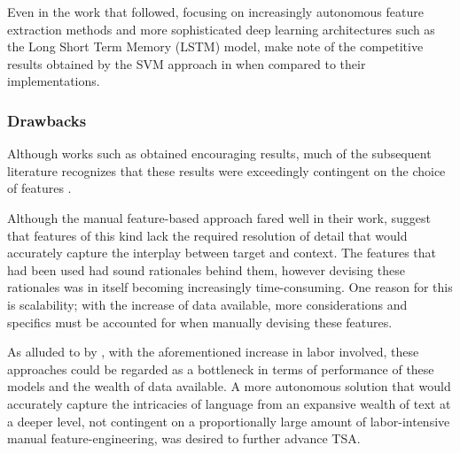 \documentclass[../../fyp.tex]{subfiles}
\begin{document}
Even in the work that followed, focusing on increasingly autonomous feature extraction methods and more sophisticated deep learning architectures such as the Long Short Term Memory (LSTM) model, \citep{tang2016b} make note of the competitive results obtained by the SVM approach in \citep{kiritchenko} when compared to their implementations.

\subsubsection{Drawbacks}
Although works such as \citep{kiritchenko,wagner2014} obtained encouraging results, much of the subsequent literature recognizes that these results were exceedingly contingent on the choice of features \citep{tang2016b}.

Although the manual feature-based approach fared well in their work, \citet{tang2016b} suggest that features of this kind lack the required resolution of detail that would accurately capture the interplay between target and context. The features that had been used had sound rationales behind them, however devising these rationales was in itself becoming increasingly time-consuming. One reason for this is scalability; with the increase of data available, more considerations and specifics must be accounted for when manually devising these features.

As alluded to by \citet{zheng2018}, with the aforementioned increase in labor involved, these approaches could be regarded as a bottleneck in terms of performance of these models and the wealth of data available. A more autonomous solution that would accurately capture the intricacies of language from an expansive wealth of text at a deeper level, not contingent on a proportionally large amount of labor-intensive manual feature-engineering, was desired to further advance TSA.
\end{document}
